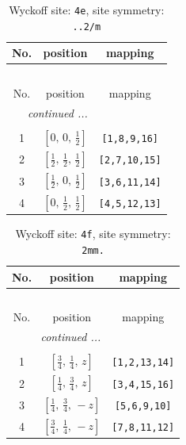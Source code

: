 \documentclass[fleqn,8pt]{jsarticle}
\begin{document}
\begin{longtable}{ccc}
\caption{Wyckoff site: {\tt 4e}, site symmetry: {\tt ..2/m}}
 \\
 \hline \hline
No. & position & mapping \\ \hline \endfirsthead

\multicolumn{2}{l}{\tablename\ \thetable{}} \\
 \hline \hline
No. & position & mapping \\ \hline \endhead

 \hline \hline
\multicolumn{2}{r}{\footnotesize\it continued ...} \\ \endfoot

 \hline \hline
\multicolumn{2}{r}{} \\ \endlastfoot

1 & $\left[ 0,\, 0,\, \frac{1}{2} \right]$ & {\tt [1,8,9,16]} \\ \hline
2 & $\left[ \frac{1}{2},\, \frac{1}{2},\, \frac{1}{2} \right]$ & {\tt [2,7,10,15]} \\ \hline
3 & $\left[ \frac{1}{2},\, 0,\, \frac{1}{2} \right]$ & {\tt [3,6,11,14]} \\ \hline
4 & $\left[ 0,\, \frac{1}{2},\, \frac{1}{2} \right]$ & {\tt [4,5,12,13]} \\
\end{longtable}
\renewcommand{\arraystretch}{1.2}
\begin{longtable}{ccc}
\caption{Wyckoff site: {\tt 4f}, site symmetry: {\tt 2mm.}}
 \\
 \hline \hline
No. & position & mapping \\ \hline \endfirsthead

\multicolumn{2}{l}{\tablename\ \thetable{}} \\
 \hline \hline
No. & position & mapping \\ \hline \endhead

 \hline \hline
\multicolumn{2}{r}{\footnotesize\it continued ...} \\ \endfoot

 \hline \hline
\multicolumn{2}{r}{} \\ \endlastfoot

1 & $\left[ \frac{3}{4},\, \frac{1}{4},\, z \right]$ & {\tt [1,2,13,14]} \\ \hline
2 & $\left[ \frac{1}{4},\, \frac{3}{4},\, z \right]$ & {\tt [3,4,15,16]} \\ \hline
3 & $\left[ \frac{1}{4},\, \frac{3}{4},\, - z \right]$ & {\tt [5,6,9,10]} \\ \hline
4 & $\left[ \frac{3}{4},\, \frac{1}{4},\, - z \right]$ & {\tt [7,8,11,12]} \\
\end{longtable}
\end{document}

